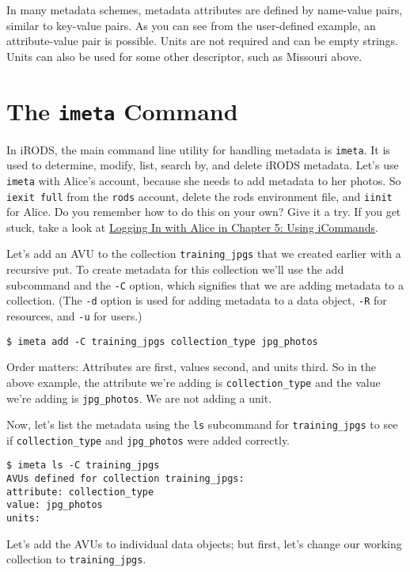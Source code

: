 \documentclass[10pt,oneside]{memoir}
\begin{document}
In many metadata schemes, metadata attributes are defined by name-value pairs, similar to key-value pairs. As you can see from the user-defined example, an attribute-value pair is possible. Units are not required and can be empty strings. Units can also be used for some other descriptor, such as Missouri above.

\section{The \texttt{imeta} Command}
In iRODS, the main command line utility for handling metadata is \texttt{imeta}. It is used to determine, modify, list, search by, and delete iRODS metadata. Let's use \texttt{imeta} with Alice's account, because she needs to add metadata to her photos. So \texttt{iexit full} from the \texttt{rods} account, delete the rods environment file, and \texttt{iinit} for Alice. Do you remember how to do this on your own? Give it a try. If you get stuck, take a look at \hyperref[sec:logging_in_with_alice]{Logging In with Alice in Chapter 5: Using iCommands}.

Let's add an AVU to the collection \texttt{training\_jpgs} that we created earlier with a recursive put. To create metadata for this collection we'll use the add subcommand and the \texttt{-C} option, which signifies that we are adding metadata to a collection. (The \texttt{-d} option is used for adding metadata to a data object, \texttt{-R} for resources, and \texttt{-u} for users.)

\begin{lstlisting}
$ imeta add -C training_jpgs collection_type jpg_photos
\end{lstlisting}

Order matters: Attributes are first, values second, and units third. So in the above example, the attribute we're adding is \texttt{collection\_type} and the value we're adding is \texttt{jpg\_photos}. We are not adding a unit.

Now, let's list the metadata using the \texttt{ls} subcommand for \texttt{training\_jpgs} to see if \texttt{collection\_type} and \texttt{jpg\_photos} were added correctly.

\begin{lstlisting}
$ imeta ls -C training_jpgs
AVUs defined for collection training_jpgs:
attribute: collection_type
value: jpg_photos
units:
\end{lstlisting}

Let's add the AVUs to individual data objects; but first, let's change our working collection to \texttt{training\_jpgs}.
\end{document}
